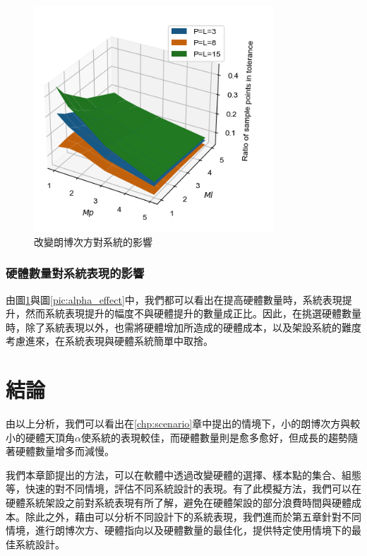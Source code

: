 \begin{figure}[htpb]
    \centering
    \includegraphics[width=9cm]{ch4pic/m_effect.png}
    \caption{改變朗博次方對系統的影響}
    \label{pic:m_effect}
\end{figure}

\subsubsection{硬體數量對系統表現的影響}
\label{chp:amount_effect}

由圖\ref{pic:m_effect}與圖\ref{pic:alpha_effect}中，我們都可以看出在提高硬體數量時，系統表現提升，然而系統表現提升的幅度不與硬體提升的數量成正比。因此，在挑選硬體數量時，除了系統表現以外，也需將硬體增加所造成的硬體成本，以及架設系統的難度考慮進來，在系統表現與硬體系統簡單中取捨。




\section{結論}
\label{chp:4_conclusion}
由以上分析，我們可以看出在\ref{chp:scenario}章中提出的情境下，小的朗博次方與較小的硬體天頂角$\alpha$使系統的表現較佳，而硬體數量則是愈多愈好，但成長的趨勢隨著硬體數量增多而減慢。

我們本章節提出的方法，可以在軟體中透過改變硬體的選擇、樣本點的集合、組態等，快速的對不同情境，評估不同系統設計的表現。有了此模擬方法，我們可以在硬體系統架設之前對系統表現有所了解，避免在硬體架設的部分浪費時間與硬體成本。除此之外，藉由可以分析不同設計下的系統表現，我們進而於第五章針對不同情境，進行朗博次方、硬體指向以及硬體數量的最佳化，提供特定使用情境下的最佳系統設計。




































